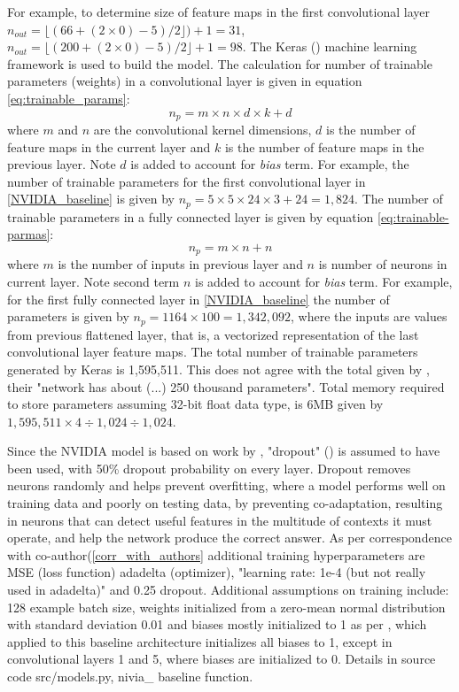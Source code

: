 For example, to determine size of feature maps in the first convolutional layer $n_{out}=\lfloor(66+(2\times0)-5)/2\rfloor)+1=31$, $n_{out}=\lfloor(200+(2\times0)-5)/2\rfloor+1=98$. The Keras (\cite{chollet2015keras}) machine learning framework is used to build the model. The calculation for number of trainable parameters (weights) in a convolutional layer is given in equation \ref{eq:trainable_params}:
\begin{equation}
    \label{eq:trainable_params}
    n_p= m \times n \times  d \times k + d
\end{equation}
where $m$ and $n$ are the convolutional kernel dimensions, $d$ is the number of feature maps in the current layer and $k$ is the number of feature maps in the previous layer. Note $d$ is added to account for \textit{bias} term. For example, the number of trainable parameters for the first convolutional layer in \ref{NVIDIA_baseline} is given by $n_p = 5 \times 5 \times 24 \times 3 + 24 = 1,824$. The number of trainable parameters in a fully connected layer is given by equation \ref{eq:trainable-parmas}:
\begin{equation}
    \label{eq:trainable-parmas}
    n_p= m \times n + n
\end{equation}
where $m$ is the number of inputs in previous layer and $n$ is number of neurons in current layer. Note second term $n$ is added to account for \textit{bias} term. For example, for the first fully connected layer in \ref{NVIDIA_baseline} the number of parameters is given by $n_p = 1164 \times 100 = 1,342,092$, where the inputs are values from previous flattened layer, that is, a vectorized representation of the last convolutional layer feature maps.  
The total number of trainable parameters generated by Keras is 1,595,511. This does not agree with the total given by \cite{bojarski2016end}, their "network  has  about (...) 250 thousand parameters". Total memory required to store parameters assuming 32-bit float data type, is 6MB given by $1,595,511 \times 4 \div 1,024 \div 1,024$.

Since the NVIDIA model is based on work by \cite{krizhevsky2012imagenet}, "dropout" (\cite{hinton2012improving}) is assumed to have been used, with 50\% dropout probability on every layer.  
Dropout removes neurons randomly and helps prevent overfitting, where a model performs well on training data and poorly on testing data, by preventing co-adaptation, resulting in neurons that can detect useful features in the multitude of contexts it must operate, and help the network produce the correct answer.
As per correspondence with co-author(\ref{corr_with_authors} additional training hyperparameters are MSE (loss function) 
adadelta (optimizer), "learning rate: 1e-4 (but not really used in adadelta)" and 0.25 dropout.
Additional assumptions on training include: 128 example batch size, weights initialized from a zero-mean normal distribution with standard deviation 0.01 and biases mostly initialized to 1 as per \cite{krizhevsky2012imagenet}, which applied to this baseline architecture initializes all biases to 1, except in convolutional layers 1 and 5, where biases are initialized to 0. Details in source code src/models.py, nivia\_ baseline function.  



